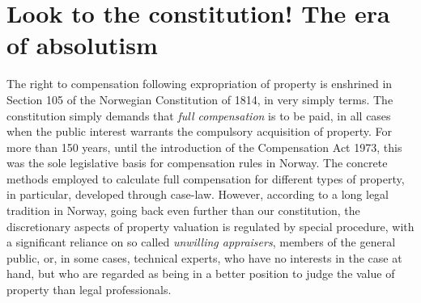 \documentclass[10pt]{article} %
\begin{document}
%

\section{Look to the constitution! The era of absolutism}\label{sec:ab}

The right to compensation following expropriation of property is enshrined in Section 105 of the Norwegian Constitution of 1814, in very simply terms. The constitution simply demands that \emph{full compensation} is to be paid, in all cases when the public interest warrants the compulsory acquisition of property. For more than 150 years, until the introduction of the Compensation Act 1973, this was the sole legislative basis for compensation rules in Norway. The concrete methods employed to calculate full compensation for different types of property, in particular, developed through case-law. However, according to a long legal tradition in Norway, going back even further than our constitution, the discretionary aspects of property valuation is regulated by special procedure, with a significant reliance on so called \emph{unwilling appraisers}, members of the general public, or, in some cases, technical experts, who have no interests in the case at hand, but who are regarded as being in a better position to judge the value of property than legal professionals.
\end{document}
